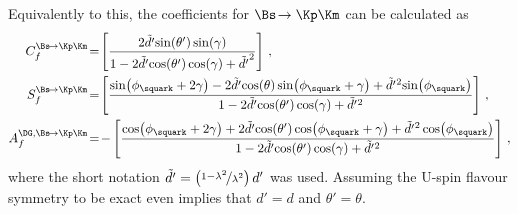 Equivalently to this, the \CP coefficients for $\Bs\!\to\Kp\Km$ can be calculated as
\begin{equation}
\begin{aligned}
C_{f}^{\Bs\!\to\Kp\Km}&\!=\!\left[\frac{2\tilde{d'}\!\sin\!\left(\theta'\right)\sin\!\left(\gamma\right)}{1-2\tilde{d'}\!\cos\!\left(\theta'\right)\cos\!\left(\gamma\right)+\tilde{d'}^2}\right]\,,\\
S_{f}^{\Bs\!\to\Kp\Km}&\!=\!\left[\frac{\sin\!\left(\phi_\squark+2\gamma\right)-2\tilde{d'}\!\cos\!\left(\theta\right)\sin\!\left(\phi_\squark+\gamma\right)+\tilde{d'}{}^2\!\sin\!\left(\phi_\squark\right)}{1-2\tilde{d'}\!\cos\!\left(\theta'\right)\cos\!\left(\gamma\right)+\tilde{d'}{}^2}\right]\,,\\
A_f^{\DG, \Bs\!\to\Kp\Km}&\!=\!-\left[\frac{\cos\!\left(\phi_\squark+2\gamma\right)+2\tilde{d'}\!\cos\!\left(\theta'\right)\cos\!\left(\phi_\squark+\gamma\right)+\tilde{d'}{}^2\cos\!\left(\phi_\squark\right)}{1-2\tilde{d'}\!\cos\!\left(\theta'\right)\cos\!\left(\gamma\right)+\tilde{d'}{}^2}\right]\,,
\end{aligned}
\end{equation}
where the short notation $\tilde{d'}=\left(\nicefrac{1-\lambda^2}{\lambda^2}\right)d'$ was used.
Assuming the U-spin flavour symmetry to be exact even implies that $d'=d$ and $\theta'=\theta$.

